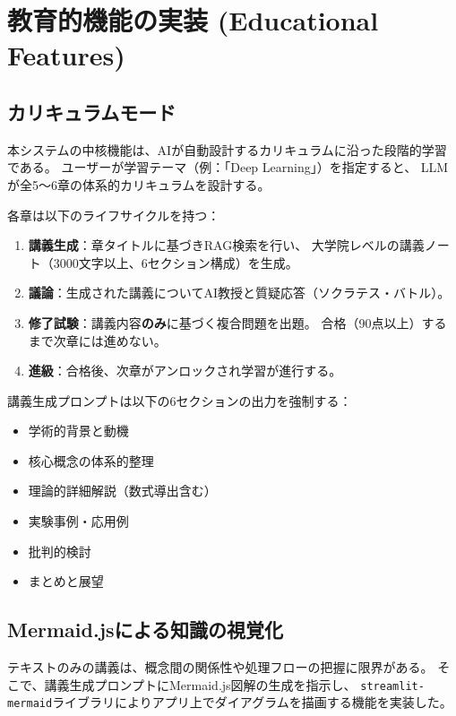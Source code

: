 \documentclass[uplatex, dvipdfmx, a4paper, 11pt]{jsarticle}
\begin{document}
\section{教育的機能の実装 (Educational Features)}

\subsection{カリキュラムモード}
本システムの中核機能は、AIが自動設計するカリキュラムに沿った段階的学習である。
ユーザーが学習テーマ（例：「Deep Learning」）を指定すると、
LLMが全5〜6章の体系的カリキュラムを設計する。

各章は以下のライフサイクルを持つ：
\begin{enumerate}
    \item \textbf{講義生成}：章タイトルに基づきRAG検索を行い、
          大学院レベルの講義ノート（3000文字以上、6セクション構成）を生成。
    \item \textbf{議論}：生成された講義についてAI教授と質疑応答（ソクラテス・バトル）。
    \item \textbf{修了試験}：講義内容\textbf{のみ}に基づく複合問題を出題。
          合格（90点以上）するまで次章には進めない。
    \item \textbf{進級}：合格後、次章がアンロックされ学習が進行する。
\end{enumerate}

講義生成プロンプトは以下の6セクションの出力を強制する：
\begin{itemize}
    \item[\textcircled{1}] 学術的背景と動機
    \item[\textcircled{2}] 核心概念の体系的整理
    \item[\textcircled{3}] 理論的詳細解説（数式導出含む）
    \item[\textcircled{4}] 実験事例・応用例
    \item[\textcircled{5}] 批判的検討
    \item[\textcircled{6}] まとめと展望
\end{itemize}

\subsection{Mermaid.jsによる知識の視覚化}
テキストのみの講義は、概念間の関係性や処理フローの把握に限界がある。
そこで、講義生成プロンプトにMermaid.js図解の生成を指示し、
\texttt{streamlit-mermaid}ライブラリによりアプリ上でダイアグラムを描画する機能を実装した。
\end{document}
